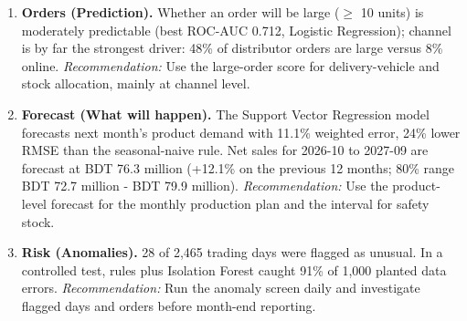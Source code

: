 \begin{enumerate}[leftmargin=*,itemsep=4pt]
\item \textbf{Orders (Prediction).} Whether an order will be large ($\geq$ 10 units) is moderately predictable (best ROC-AUC 0.712, Logistic Regression); channel is by far the strongest driver: 48\% of distributor orders are large versus 8\% online. \emph{Recommendation:} Use the large-order score for delivery-vehicle and stock allocation, mainly at channel level.
\item \textbf{Forecast (What will happen).} The Support Vector Regression model forecasts next month's product demand with 11.1\% weighted error, 24\% lower RMSE than the seasonal-naive rule. Net sales for 2026-10 to 2027-09 are forecast at BDT 76.3 million (+12.1\% on the previous 12 months; 80\% range BDT 72.7 million - BDT 79.9 million). \emph{Recommendation:} Use the product-level forecast for the monthly production plan and the interval for safety stock.
\item \textbf{Risk (Anomalies).} 28 of 2,465 trading days were flagged as unusual. In a controlled test, rules plus Isolation Forest caught 91\% of 1,000 planted data errors. \emph{Recommendation:} Run the anomaly screen daily and investigate flagged days and orders before month-end reporting.
\end{enumerate}